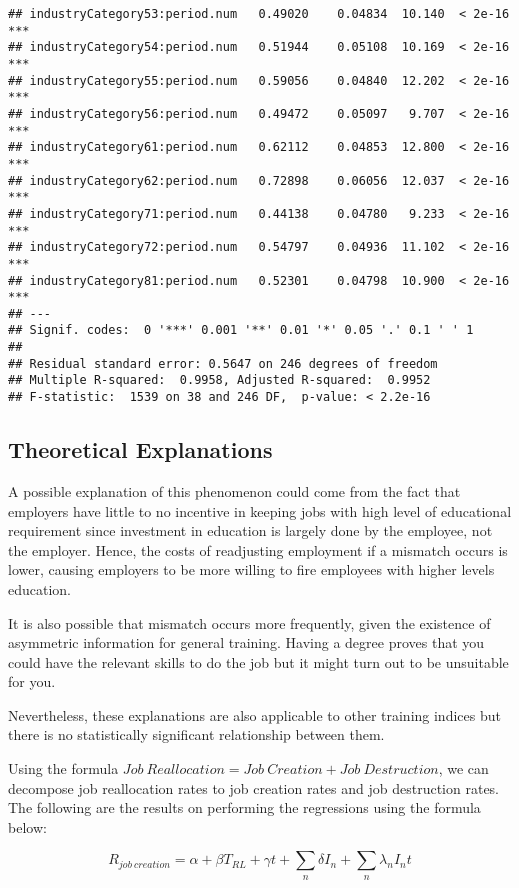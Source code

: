 \documentclass[
]{article}
\begin{document}
\begin{verbatim}
## industryCategory53:period.num   0.49020    0.04834  10.140  < 2e-16 ***
## industryCategory54:period.num   0.51944    0.05108  10.169  < 2e-16 ***
## industryCategory55:period.num   0.59056    0.04840  12.202  < 2e-16 ***
## industryCategory56:period.num   0.49472    0.05097   9.707  < 2e-16 ***
## industryCategory61:period.num   0.62112    0.04853  12.800  < 2e-16 ***
## industryCategory62:period.num   0.72898    0.06056  12.037  < 2e-16 ***
## industryCategory71:period.num   0.44138    0.04780   9.233  < 2e-16 ***
## industryCategory72:period.num   0.54797    0.04936  11.102  < 2e-16 ***
## industryCategory81:period.num   0.52301    0.04798  10.900  < 2e-16 ***
## ---
## Signif. codes:  0 '***' 0.001 '**' 0.01 '*' 0.05 '.' 0.1 ' ' 1
## 
## Residual standard error: 0.5647 on 246 degrees of freedom
## Multiple R-squared:  0.9958, Adjusted R-squared:  0.9952 
## F-statistic:  1539 on 38 and 246 DF,  p-value: < 2.2e-16
\end{verbatim}

\hypertarget{theoretical-explanations}{%
\subsection{Theoretical Explanations}\label{theoretical-explanations}}

A possible explanation of this phenomenon could come from the fact that
employers have little to no incentive in keeping jobs with high level of
educational requirement since investment in education is largely done by
the employee, not the employer. Hence, the costs of readjusting
employment if a mismatch occurs is lower, causing employers to be more
willing to fire employees with higher levels education.

It is also possible that mismatch occurs more frequently, given the
existence of asymmetric information for general training. Having a
degree proves that you could have the relevant skills to do the job but
it might turn out to be unsuitable for you.

Nevertheless, these explanations are also applicable to other training
indices but there is no statistically significant relationship between
them.

Using the formula
\(Job\ Reallocation = Job\ Creation + Job\ Destruction\), we can
decompose job reallocation rates to job creation rates and job
destruction rates. The following are the results on performing the
regressions using the formula below:

\[R_{job \ creation} = \alpha + \beta T_{RL} + \gamma t + \sum_n \delta I_n + \sum_n \lambda_n I_n t\]
\end{document}

